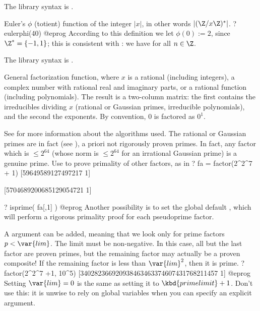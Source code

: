 The library syntax is .

\label{se:eulerphi}
Euler's $\phi$ (totient) function of the
integer $|x|$, in other words $|(\Z/x\Z)^*|$.
\bprog
? eulerphi(40)
@eprog\noindent
According to this definition we let $\phi(0) := 2$, since $\Z^* = \{-1,1\}$;
this is consistent with : we have
 for all $n\in\Z$.

The library syntax is .

\label{se:factor}
General factorization function, where $x$ is a
rational (including integers), a complex number with rational
real and imaginary parts, or a rational function (including polynomials).
The result is a two-column matrix: the first contains the irreducibles
dividing $x$ (rational or Gaussian primes, irreducible polynomials),
and the second the exponents. By convention, $0$ is factored as $0^1$.

See  for more information about the algorithms used.
The rational or Gaussian primes are in fact 
(see ), a priori not rigorously proven primes. In fact,
any factor which is $\leq 2^{64}$ (whose norm is $\leq 2^{64}$ for an
irrational Gaussian prime) is a genuine prime. Use  to prove
primality of other factors, as in
\bprog
? fa = factor(2^2^7 + 1)
[59649589127497217 1]

[5704689200685129054721 1]

? isprime( fa[,1] )
@eprog\noindent
Another possibility is to set the global default , which
will perform a rigorous primality proof for each pseudoprime factor.

A  argument  can be added, meaning that we look only for
prime factors $p < \var{lim}$. The limit  must be non-negative.
In this case, all but the last factor are proven primes, but the remaining
factor may actually be a proven composite! If the remaining factor is less
than $\var{lim}^2$, then it is prime.
\bprog
? factor(2^2^7 +1, 10^5)
[340282366920938463463374607431768211457 1]
@eprog\noindent
{} Setting $\var{lim}=0$ is the same
as setting it to $\kbd{primelimit} + 1$. Don't use this: it is unwise to
rely on global variables when you can specify an explicit argument.
\smallskip

